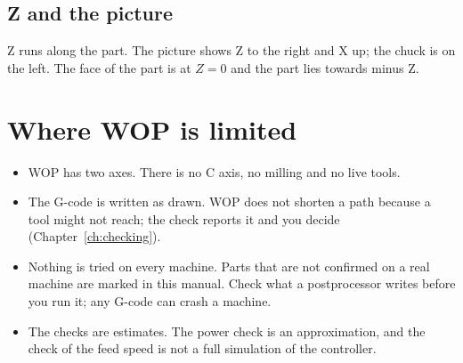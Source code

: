 \subsection{Z and the picture}
Z runs along the part. The picture shows Z to the right and X up; the chuck is on the left. The face of the part is at $Z=0$ and the part lies towards minus Z.

\section{Where WOP is limited}
\begin{itemize}
  \item WOP has two axes. There is no C axis, no milling and no live tools.
  \item The G-code is written as drawn. WOP does not shorten a path because a tool might not reach; the check reports it and you decide (Chapter~\ref{ch:checking}).
  \item Nothing is tried on every machine. Parts that are not confirmed on a real machine are marked in this manual. Check what a postprocessor writes before you run it; any G-code can crash a machine.
  \item The checks are estimates. The power check is an approximation, and the check of the feed speed is not a full simulation of the controller.
\end{itemize}
